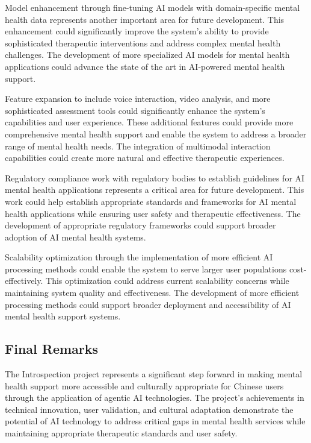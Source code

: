 Model enhancement through fine-tuning AI models with domain-specific mental health data represents another important area for future development. This enhancement could significantly improve the system's ability to provide sophisticated therapeutic interventions and address complex mental health challenges. The development of more specialized AI models for mental health applications could advance the state of the art in AI-powered mental health support.

Feature expansion to include voice interaction, video analysis, and more sophisticated assessment tools could significantly enhance the system's capabilities and user experience. These additional features could provide more comprehensive mental health support and enable the system to address a broader range of mental health needs. The integration of multimodal interaction capabilities could create more natural and effective therapeutic experiences.

Regulatory compliance work with regulatory bodies to establish guidelines for AI mental health applications represents a critical area for future development. This work could help establish appropriate standards and frameworks for AI mental health applications while ensuring user safety and therapeutic effectiveness. The development of appropriate regulatory frameworks could support broader adoption of AI mental health systems.

Scalability optimization through the implementation of more efficient AI processing methods could enable the system to serve larger user populations cost-effectively. This optimization could address current scalability concerns while maintaining system quality and effectiveness. The development of more efficient processing methods could support broader deployment and accessibility of AI mental health support systems.

\subsection{Final Remarks}

The Introspection project represents a significant step forward in making mental health support more accessible and culturally appropriate for Chinese users through the application of agentic AI technologies. The project's achievements in technical innovation, user validation, and cultural adaptation demonstrate the potential of AI technology to address critical gaps in mental health services while maintaining appropriate therapeutic standards and user safety.


